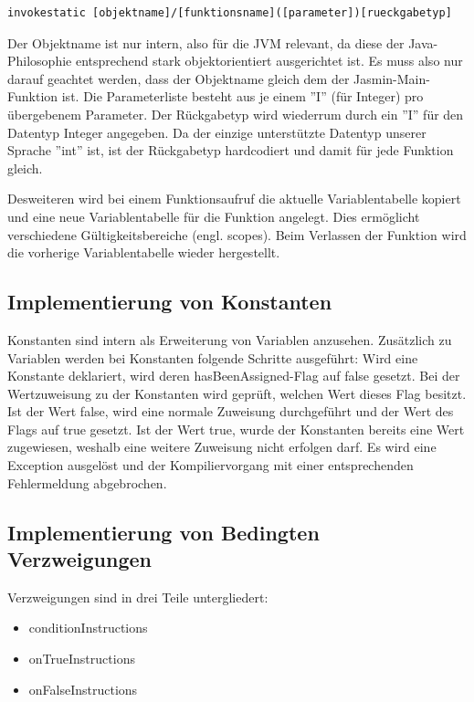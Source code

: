 \scriptsize
\begin{lstlisting}[frame=single]
invokestatic [objektname]/[funktionsname]([parameter])[rueckgabetyp]
\end{lstlisting}
\normalsize

Der Objektname ist nur intern, also für die JVM relevant, da diese der Java-Philosophie entsprechend stark objektorientiert ausgerichtet ist. Es muss also nur darauf geachtet werden, dass der Objektname gleich dem der Jasmin-Main-Funktion ist.
Die Parameterliste besteht aus je einem ''I'' (für Integer) pro übergebenem Parameter.
Der Rückgabetyp wird wiederrum durch ein ''I'' für den Datentyp Integer angegeben. Da der einzige unterstützte Datentyp unserer Sprache ''int'' ist, ist der Rückgabetyp hardcodiert und damit für jede Funktion gleich.

Desweiteren wird bei einem Funktionsaufruf die aktuelle Variablentabelle kopiert und eine neue Variablentabelle für die Funktion angelegt. Dies ermöglicht verschiedene Gültigkeitsbereiche (engl. scopes). 
Beim Verlassen der Funktion wird die vorherige Variablentabelle wieder hergestellt.

\subsection{Implementierung von Konstanten}
Konstanten sind intern als Erweiterung von Variablen anzusehen. 
Zusätzlich zu Variablen werden bei Konstanten folgende Schritte ausgeführt:
Wird eine Konstante deklariert, wird deren hasBeenAssigned-Flag auf false gesetzt.
Bei der Wertzuweisung zu der Konstanten wird geprüft, welchen Wert dieses Flag besitzt. Ist der Wert false, wird eine normale Zuweisung durchgeführt und der Wert des Flags auf true gesetzt. Ist der Wert true, wurde der Konstanten bereits eine Wert zugewiesen, weshalb eine weitere Zuweisung nicht erfolgen darf. Es wird eine Exception ausgelöst und der Kompiliervorgang mit einer entsprechenden Fehlermeldung abgebrochen.

\pagebreak
\subsection{Implementierung von Bedingten Verzweigungen}
Verzweigungen sind in drei Teile untergliedert:
\begin{itemize}
	\item conditionInstructions
	\item onTrueInstructions
	\item onFalseInstructions	
\end{itemize}

